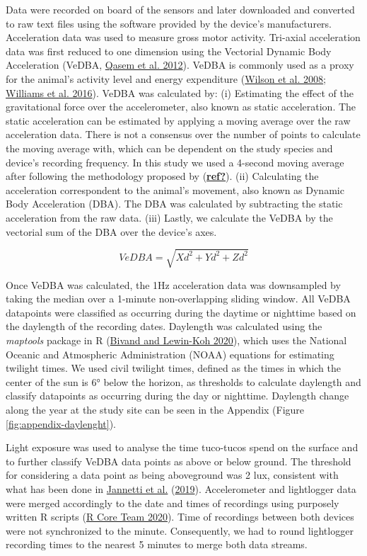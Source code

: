 \documentclass[english,msc,numbers,hidelinks]{coppe}
\begin{document}
  Data were recorded on board of the sensors and later downloaded and converted to raw text files using the software provided by the device's manufacturers. Acceleration data was used to measure gross motor activity. Tri-axial acceleration data was first reduced to one dimension using the Vectorial Dynamic Body Acceleration (VeDBA, \protect\hyperlink{ref-qasem2012}{Qasem et al. 2012}). VeDBA is commonly used as a proxy for the animal's activity level and energy expenditure (\protect\hyperlink{ref-wilson2008}{Wilson et al. 2008}; \protect\hyperlink{ref-williams2016}{Williams et al. 2016}). VeDBA was calculated by: (i) Estimating the effect of the gravitational force over the accelerometer, also known as static acceleration. The static acceleration can be estimated by applying a moving average over the raw acceleration data. There is not a consensus over the number of points to calculate the moving average with, which can be dependent on the study species and device's recording frequency. In this study we used a 4-second moving average after following the methodology proposed by (\protect\hyperlink{ref-ref}{\textbf{ref?}}). (ii) Calculating the acceleration correspondent to the animal's movement, also known as Dynamic Body Acceleration (DBA). The DBA was calculated by subtracting the static acceleration from the raw data. (iii) Lastly, we calculate the VeDBA by the vectorial sum of the DBA over the device's axes.

  \[ VeDBA = \sqrt{Xd^2 + Yd^2 + Zd^2} \]

  Once VeDBA was calculated, the 1Hz acceleration data was downsampled by taking the median over a 1-minute non-overlapping sliding window. All VeDBA datapoints were classified as occurring during the daytime or nighttime based on the daylength of the recording dates. Daylength was calculated using the \emph{maptools} package in R (\protect\hyperlink{ref-bivand2020}{Bivand and Lewin-Koh 2020}), which uses the National Oceanic and Atmospheric Administration (NOAA) equations for estimating twilight times. We used civil twilight times, defined as the times in which the center of the sun is 6° below the horizon, as thresholds to calculate daylength and classify datapoints as occurring during the day or nighttime. Daylength change along the year at the study site can be seen in the Appendix (Figure \ref{fig:appendix-daylenght}).

  Light exposure was used to analyse the time tuco-tucos spend on the surface and to further classify VeDBA data points as above or below ground. The threshold for considering a data point as being aboveground was 2 lux, consistent with what has been done in \protect\hyperlink{ref-jannetti2019}{Jannetti et al.} (\protect\hyperlink{ref-jannetti2019}{2019}). Accelerometer and lightlogger data were merged accordingly to the date and times of recordings using purposely written R scripts (\protect\hyperlink{ref-rcoreteam2020}{R Core Team 2020}). Time of recordings between both devices were not synchronized to the minute. Consequently, we had to round lightlogger recording times to the nearest 5 minutes to merge both data streams.
\end{document}
